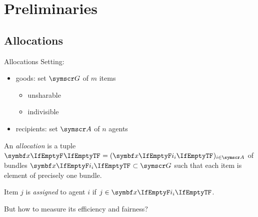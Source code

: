 \section{Preliminaries}

\subsection{Allocations}
\begin{frame}{Allocations}
	Setting:
	\begin{itemize}
		\item
		goods: set \(\goods\) of \(m\) items
		\begin{itemize}
			\item
			unsharable

			\item
			indivisible
		\end{itemize}

		\item
		recipients: set \(\agents\) of \(n\) agents
	\end{itemize}
	\begin{definition}
		An \emph{allocation} is a tuple
		\(\alloc[][] = (\alloc)_{i \in \agents}\)
		of bundles \(\alloc \subset \goods\) such that each item is element of precisely one bundle.

		Item \(j\) is \emph{assigned} to agent \(i\) if \(j \in \alloc\).
	\end{definition}

	But how to measure its efficiency and fairness?
\end{frame}

